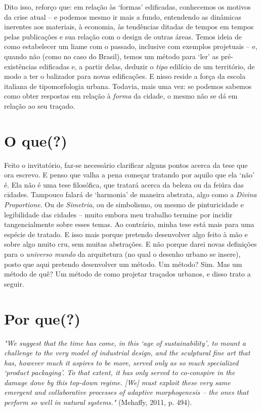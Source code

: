 \documentclass[]{report}
\begin{document}
Dito isso, reforço que: em relação às `formas' edificadas, conhecemos os motivos da crise atual  – e podemos mesmo ir mais a fundo, entendendo as dinâmicas inerentes aos materiais, à economia, às tendências ditadas de tempos em tempos pelas publicações e sua relação com o design de outras áreas. Temos ideia de como estabelecer um liame com o passado, inclusive com exemplos projetuais – e, quando não (como no caso do Brasil), temos um método para `ler' as pré-existências edificadas e, a partir delas, deduzir o \textit{tipo} edilício de um território, de modo a ter o balizador para novas edificações. E nisso reside a força da escola italiana de tipomorfologia urbana. Todavia, mais uma vez: se podemos sabemos como obter respostas em relação à \textit{forma} da cidade, o mesmo não se dá em relação ao seu traçado.

\section{O que(?)}

Feito o invitatório, faz-se necessário clarificar alguns pontos acerca da tese que ora escrevo. E penso que valha a pena começar tratando por aquilo que ela `não' é. Ela não é uma tese filosófica, que tratará acerca da beleza ou da feiúra das cidades. Tampouco falará de `harmonia' de maneira abstrata, algo como a \textit{Divina Proportione}. Ou de \textit{Simetria}, ou de simbolismo, ou mesmo de pinturicidade e legibilidade das cidades – muito embora meu trabalho termine por incidir tangencialmente sobre esses temas. Ao contrário, minha tese está mais para uma espécie de tratado. E isso mais porque pretendo desenvolver algo feito à mão e sobre algo muito cru, sem muitas abstrações. E não porque darei novas definições para o \textit{universo mundo} da arquitetura (no qual o desenho urbano se insere), posto que aqui pretendo desenvolver um método. Um método? Sim. Mas um método de quê? Um método de como projetar traçados urbanos, e disso trato a seguir.

\section{Por que(?)}


\textit{"We suggest that the time has come, in this ‘age of sustainability’, to mount a challenge to the very model of industrial design, and the sculptural fine art that has, however much it aspires to be more, served only as so much specialized ‘product packaging’. To that extent, it has only served to co-conspire in the damage done by this top-down regime. [We] must exploit these very same emergent and collaborative processes of adaptive morphogenesis – the ones that perform so well in natural systems."} (Mehaffy, 2011, p. 494).
\end{document}
